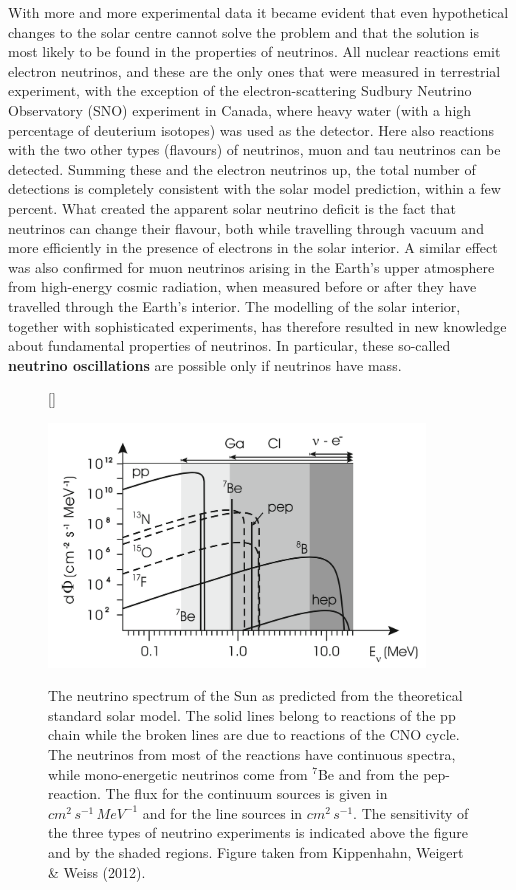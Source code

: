 \documentclass[a4paper,10pt]{article}
\begin{document}
{\noindent}With more and more experimental data it became evident that even hypothetical changes to the solar centre cannot solve the problem and that the solution is most likely to be found in the properties of neutrinos. All nuclear reactions emit electron neutrinos, and these are the only ones that were measured in terrestrial experiment, with the exception of the electron-scattering Sudbury Neutrino Observatory (SNO) experiment in Canada, where heavy water (with a high percentage of deuterium isotopes) was used as the detector. Here also reactions with the two other types (flavours) of neutrinos, muon and tau neutrinos can be detected. Summing these and the electron neutrinos up, the total number of detections is completely consistent with the solar model prediction, within a few percent. What created the apparent solar neutrino deficit is the fact that neutrinos can change their flavour, both while travelling through vacuum and more efficiently in the presence of electrons in the solar interior. A similar effect was also confirmed for muon neutrinos arising in the Earth's upper atmosphere from high-energy cosmic radiation, when measured before or after they have travelled through the Earth's interior. The modelling of the solar interior, together with sophisticated experiments, has therefore resulted in new knowledge about fundamental properties of neutrinos. In particular, these so-called \textbf{neutrino oscillations} are possible only if neutrinos have mass.

\begin{figure}[t]
    [\FBwidth]
    {\caption{\footnotesize{The neutrino spectrum of the Sun as predicted from the theoretical standard solar model. The solid lines belong to reactions of the pp chain while the broken lines are due to reactions of the CNO cycle. The neutrinos from most of the reactions have continuous spectra, while mono-energetic neutrinos come from $^7$Be and from the pep-reaction. The flux  for the continuum sources is given in $cm^2\,s^{-1}\,MeV^{-1}$ and for the line sources in $cm^2\,s^{-1}$. The sensitivity of the three types of neutrino experiments is indicated above the figure and by the shaded regions. Figure taken from Kippenhahn, Weigert \& Weiss (2012).}}
    \label{fig:neutrinospectrum}}
    {\includegraphics[width=10cm]{figures/NeutrinoSpectrum.png}}
\end{figure}
\end{document}

